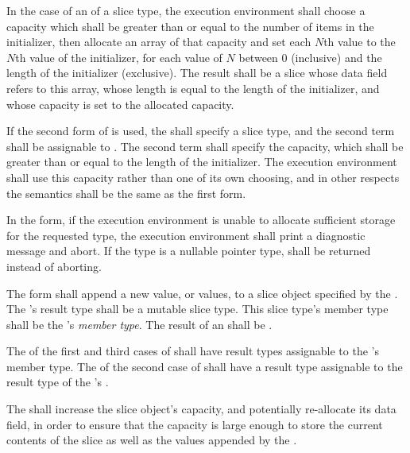 \specsubsubitem
In the case of an  of a slice type, the execution environment
shall choose a capacity which shall be greater than or equal to the number of
items in the initializer, then allocate an array of that capacity and set each
$N$th value to the $N$th value of the initializer, for each value of $N$
between $0$ (inclusive) and the length of the initializer (exclusive).  The
result shall be a slice whose data field refers to this array, whose length is
equal to the length of the initializer, and whose capacity is set to the
allocated capacity.

\specsubsubitem
If the second form of  is used, the  shall
specify a slice type, and the second term shall be assignable to
.  The second term shall specify the capacity, which shall be
greater than or equal to the length of the initializer. The execution
environment shall use this capacity rather than one of its own choosing, and in
other respects the semantics shall be the same as the first form.

\specsubsubitem
In the  form, if the execution environment is unable to
allocate sufficient storage for the requested type, the execution environment
shall print a diagnostic message and abort. If the type is a nullable pointer
type,  shall be returned instead of aborting.

\specsubsubitem
The  form shall append a new value, or values, to a slice
object specified by the . The 's
result type shall be a mutable slice type.  This slice type's member type shall
be the 's \textit{member type}. The result of an
 shall be .

\specsubsubitem
The  of the first and third cases of
 shall have result types assignable to the
's member type. The  of the second case
of  shall have a result type assignable to the result
type of the 's .

\specsubsubitem
The  shall increase the slice object's capacity, and
potentially re-allocate its data field, in order to ensure that the capacity is
large enough to store the current contents of the slice as well as the values
appended by the .

